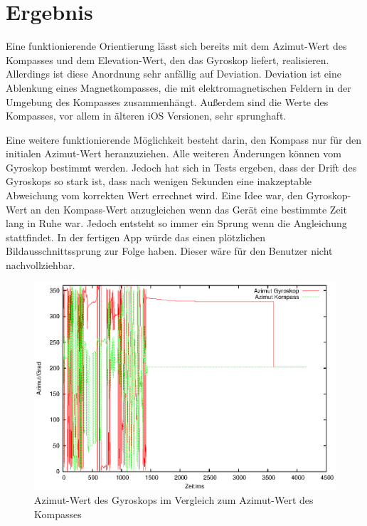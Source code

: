 
\chapter{Ergebnis}
  \label{Ergebnis}

Eine funktionierende Orientierung lässt sich bereits mit dem Azimut-Wert des Kompasses und dem Elevation-Wert, den das Gyroskop liefert, realisieren. Allerdings ist diese Anordnung sehr anfällig auf Deviation. Deviation ist eine Ablenkung eines Magnetkompasses, die mit elektromagnetischen Feldern in der Umgebung des Kompasses zusammenhängt. Außerdem sind die Werte des Kompasses, vor allem in älteren iOS Versionen, sehr sprunghaft. 

Eine weitere funktionierende Möglichkeit besteht darin, den Kompass nur für den initialen Azimut-Wert heranzuziehen. Alle weiteren Änderungen können vom Gyroskop bestimmt werden. Jedoch hat sich in Tests ergeben, dass der Drift des Gyroskops so stark ist, dass nach wenigen Sekunden eine inakzeptable Abweichung vom korrekten Wert errechnet wird. Eine Idee war, den Gyroskop-Wert an den Kompass-Wert anzugleichen wenn das Gerät eine bestimmte Zeit lang in Ruhe war. Jedoch entsteht so immer ein Sprung wenn die Angleichung stattfindet. In der fertigen App würde das einen plötzlichen Bildausschnittssprung zur Folge haben. Dieser wäre für den Benutzer nicht nachvollziehbar.

\begin{figure}[htb]
\centering
\includegraphics[scale=1]{figures/heading004}
\caption{Azimut-Wert des Gyroskops im Vergleich zum Azimut-Wert des Kompasses}
\label{fig:heading004}
\end{figure}

